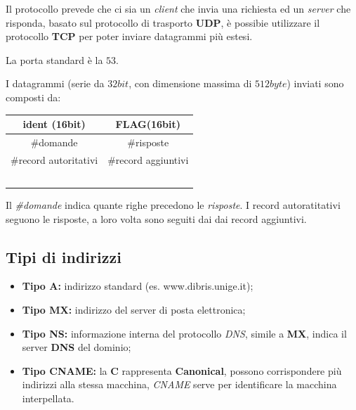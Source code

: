 Il protocollo prevede che ci sia un \emph{client} che invia una richiesta ed
un \emph{server} che risponda, basato sul protocollo di trasporto \textbf{UDP},
è possibie utilizzare il protocollo \textbf{TCP} per poter inviare datagrammi
più estesi.

La porta standard è la $53$.

I datagrammi (serie da $32bit$, con dimensione massima di $512byte$) inviati
sono composti da:

\begin{tabular}{|c|c|}
                                               \hline
  ident (16bit)        & FLAG(16bit)        \\ \hline
  \#domande             & \#risposte          \\ \hline
  \#record autoritativi & \#record aggiuntivi \\ \hline
                       &                    \\ \hline
                       &                    \\ \hline
                       &                    \\ \hline
                       &                    \\ \hline
                       &                    \\ \hline
\end{tabular}

Il \emph{\#domande} indica quante righe precedono le \emph{risposte}.
I record autoratitativi seguono le risposte, a loro volta sono seguiti dai
dai record aggiuntivi.

\subsection{Tipi di indirizzi}
\begin{itemize}
  \item \textbf{Tipo A:} indirizzo standard (es. www.dibris.unige.it);
  \item \textbf{Tipo MX:} indirizzo del server di posta elettronica;
  \item \textbf{Tipo NS:} informazione interna del protocollo \emph{DNS},
    simile a \textbf{MX}, indica il server \textbf{DNS} del dominio;
  \item \textbf{Tipo CNAME:} la \textbf{C} rappresenta \textbf{Canonical},
    possono corrispondere più indirizzi alla stessa macchina, \emph{CNAME}
    serve per identificare la macchina interpellata.
\end{itemize}

